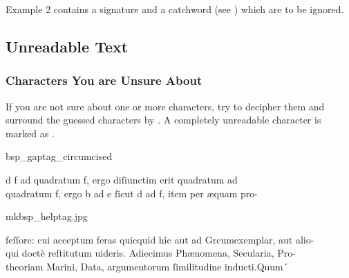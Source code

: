 \begin{crossref}
Example 2 contains a signature and a catchword (see ) which are to be ignored.
\end{crossref}


\tocspace
\subsection{Unreadable Text}
\label{section unreadable text}

\subsubsection{Characters You are Unsure About}
\label{section characters you are unsure about}

\begin{mainrule}
  If you are not sure about one or more characters, try to decipher them and surround the guessed characters by . %
  A completely unreadable character is marked as .
\end{mainrule}


\vspace{2mm}
\begin{sampleImage}[ 1: \, a stain]{bsp_gaptag_circumcised}
\begin{typeLatin}
 \someText
{}d  f ad quadratum f, ergo diſiunctim erit quadratum\lwr{} ad \\
quadratum f, ergo b ad e ſicut d ad f, item per æquam pro- \\
\someText {}
\end{typeLatin}

\end{sampleImage}

\begin{sampleImage}{mkbsp_helptag.jpg}

\begin{typeLatin}
 \someText
{}feſſore: cui acceptum feras quicquid hîc aut ad Grcum\lwr exemplar, aut alio- \\
qui doctè reſtitutum uideris. Adiecimus Phænomena, Secularia, Pro- \\
theoriam Marini,  Data, argumentorum ſimilitudine inducti.\lwr Quum\bs´
\someText {}
\end{typeLatin}
\end{sampleImage}

